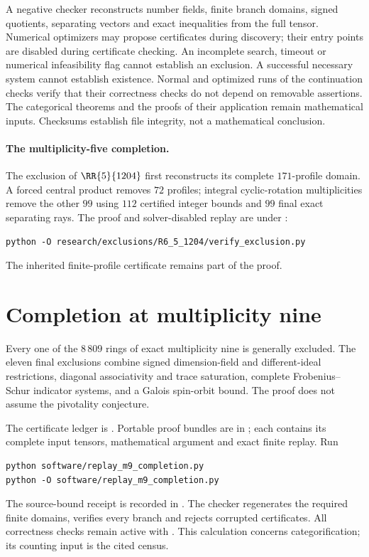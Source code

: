 \documentclass[11pt]{article}
\begin{document}
A negative checker reconstructs number fields, finite branch domains,
signed quotients, separating vectors and exact inequalities from the
full tensor. Numerical optimizers may propose certificates during
discovery; their entry points are disabled during certificate checking.
An incomplete search, timeout or numerical infeasibility flag cannot
establish an exclusion. A successful necessary system cannot establish
existence. Normal and optimized runs of the continuation checks verify
that their correctness checks do not depend on removable assertions.
The categorical theorems and the proofs of their application remain
mathematical inputs. Checksums establish file integrity, not a
mathematical conclusion.

\paragraph{The multiplicity-five completion.}
The exclusion of $\RR{5}{1204}$ first reconstructs its complete
$171$-profile domain. A forced central product removes $72$ profiles;
integral cyclic-rotation multiplicities remove the other $99$ using
$112$ certified integer bounds and $99$ final exact separating rays.
The proof and solver-disabled replay are under
:
\begin{verbatim}
python -O research/exclusions/R6_5_1204/verify_exclusion.py
\end{verbatim}
The inherited finite-profile certificate remains part of the proof.

\section{Completion at multiplicity nine}
Every one of the $8\,809$ rings of exact multiplicity nine is generally
excluded. The eleven final exclusions combine signed dimension-field and
different-ideal restrictions, diagonal associativity and trace saturation,
complete Frobenius--Schur indicator systems, and a Galois spin-orbit bound.
The proof does not assume the pivotality conjecture.

The certificate ledger is .
Portable proof bundles are in
; each contains its complete
input tensors, mathematical argument and exact finite replay. Run
\begin{verbatim}
python software/replay_m9_completion.py
python -O software/replay_m9_completion.py
\end{verbatim}
The source-bound receipt is recorded in
. The checker regenerates the
required finite domains, verifies every branch and rejects corrupted
certificates. All correctness checks remain active with .
This calculation concerns categorification; its counting input is the cited census.
\end{document}
